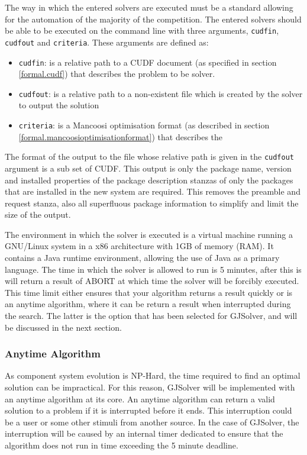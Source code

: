 The way in which the entered solvers are executed must be a standard allowing for the automation of the majority of the competition.
The entered solvers should be able to be executed on the command line with three arguments, \verb+cudfin+, \verb+cudfout+ and \verb+criteria+.
These arguments are defined as:
\begin{itemize}
  \item \verb+cudfin+: is a relative path to a CUDF document (as specified in section \ref{formal.cudf}) that describes the problem to be solver.
  \item \verb+cudfout+: is a relative path to a non-existent file which is created by the solver to output the solution
  \item \verb+criteria+: is a Mancoosi optimisation format (as described in section \ref{formal.mancoosioptimisationformat}) that describes the 
\end{itemize}
The format of the output to the file whose relative path is given in the \verb+cudfout+ argument is a sub set of CUDF.
This output is only the package name, version and installed properties of the package description stanzas of only the packages that are installed in the new system are required.
This removes the preamble and request stanza, also all superfluous package information to simplify and limit the size of the output.

The environment in which the solver is executed is a virtual machine running a GNU/Linux system in a x86 architecture with 1GB of memory (RAM).
It contains a Java runtime environment, allowing the use of Java as a primary language.
The time in which the solver is allowed to run is 5 minutes, after this is will return a result of ABORT at which time the solver will be forcibly executed.
This time limit either ensures that your algorithm returns a result quickly or is an anytime algorithm, where it can be return a result when interrupted during the search.
The latter is the option that has been selected for GJSolver, and will be discussed in the next section.

\subsubsection{Anytime Algorithm}
As component system evolution is NP-Hard, the time required to find an optimal solution can be impractical.
For this reason, GJSolver will be implemented with an anytime algorithm at its core.
An anytime algorithm can return a valid solution to a problem if it is interrupted before it ends.
This interruption could be a user or some other stimuli from another source.
In the case of GJSolver, the interruption will be caused by an internal timer dedicated to ensure that the algorithm does not run in time exceeding the 5 minute deadline.

